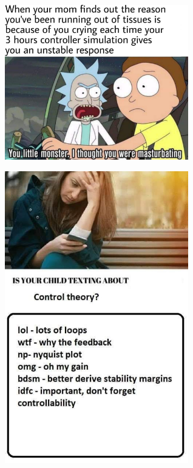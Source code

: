 \documentclass[
  10pt,
  a4paper,
  twocolumn]{article}
\numberwithin{equation}{section}
\begin{document}
\begin{figure}[H]

{\centering \includegraphics[width=8cm,height=\textheight]{images/EM8q5ItW4AEfbDo.jpg}

}

\end{figure}

\begin{figure}[H]

{\centering \includegraphics[width=8cm,height=\textheight]{images/EFEPSgaWkAEiEG3.jpg}

}

\end{figure}
\end{document}
